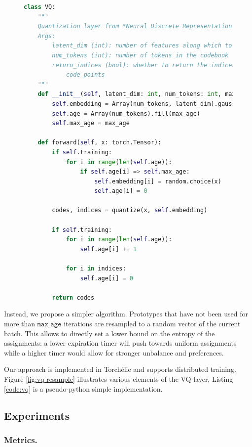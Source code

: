 \begin{figure}
\begin{lstlisting}[language=Python, caption=VQ with expiration (pseudo python),label={code:vq}]
class VQ:
    """
    Quantization layer from *Neural Discrete Representation Learning*
    Args:
        latent_dim (int): number of features along which to quantize
        num_tokens (int): number of tokens in the codebook
        return_indices (bool): whether to return the indices of the quantized
            code points
    """
    def __init__(self, latent_dim: int, num_tokens: int, max_age: int):
        self.embedding = Array(num_tokens, latent_dim).gaussian_init()
        self.age = Array(num_tokens).fill(max_age)
        self.max_age = max_age

    def forward(self, x: torch.Tensor):
        if self.training:
            for i in range(len(self.age)):
                if self.age[i] => self.max_age:
                    self.embedding[i] = random.choice(x)
                    self.age[i] = 0

        codes, indices = quantize(x, self.embedding)

        if self.training:
            for i in range(len(self.age)):
                self.age[i] += 1

            for i in indices:
                self.age[i] = 0

        return codes
\end{lstlisting}
\end{figure}

Instead, we propose a simpler algorithm. Prototypes that have not been used for more than $\texttt{max\_age}$ iterations are resampled to a random vector of the current batch. This allows to directly set a lower bound on the entropy of the assignments: a lower expiration timer will push towards uniform assignments  while a higher timer would allow for stronger unbalance and preferences.

Our approach is implemented in Torchélie and supports distributed training. Figure \ref{fig:vq-resample} illustrates various elements of the VQ layer, Listing \ref{code:vq} is a pseudo-python simple implementation.

\subsection{Experiments}

\subsubsection{Metrics.}

